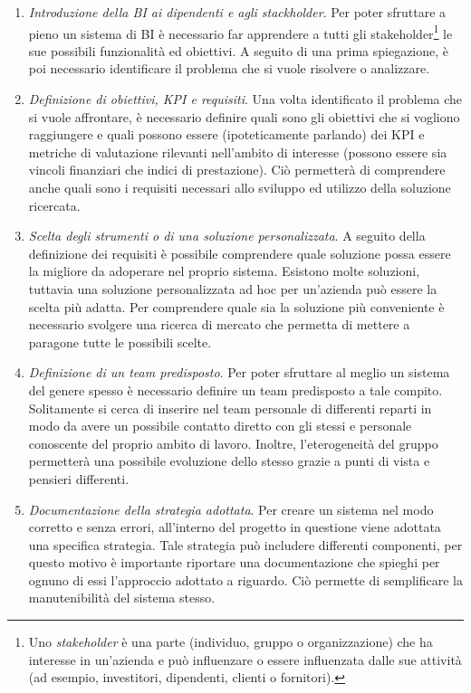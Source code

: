 \begin{enumerate}
    \item \textit{Introduzione della BI ai dipendenti e agli stackholder}. Per poter sfruttare a pieno un sistema di BI è necessario far apprendere a tutti gli stakeholder\footnote{Uno \textit{stakeholder} è una parte (individuo, gruppo o organizzazione) che ha interesse in un'azienda e può influenzare o essere influenzata dalle sue attività (ad esempio, investitori, dipendenti, clienti o fornitori).\cite{investopedia_stakeholder}} le sue possibili funzionalità ed obiettivi. A seguito di una prima spiegazione, è poi necessario identificare il problema che si vuole risolvere o analizzare.
    \item \textit{Definizione di obiettivi, KPI e requisiti}. Una volta identificato il problema che si vuole affrontare, è necessario definire quali sono gli obiettivi che si vogliono raggiungere e quali possono essere (ipoteticamente parlando) dei KPI e metriche di valutazione rilevanti nell'ambito di interesse (possono essere sia vincoli finanziari che indici di prestazione). Ciò permetterà di comprendere anche quali sono i requisiti necessari allo sviluppo ed utilizzo della soluzione ricercata.
    \item \textit{Scelta degli strumenti o di una soluzione personalizzata}. A seguito della definizione dei requisiti è possibile comprendere quale soluzione possa essere la migliore da adoperare nel proprio sistema. Esistono molte soluzioni, tuttavia una soluzione personalizzata ad hoc per un'azienda può essere la scelta più adatta. Per comprendere quale sia la soluzione più conveniente è necessario svolgere una ricerca di mercato che permetta di mettere a paragone tutte le possibili scelte.
    \item \textit{Definizione di un team predisposto}. Per poter sfruttare al meglio un sistema del genere spesso è necessario definire un team predisposto a tale compito. Solitamente si cerca di inserire nel team personale di differenti reparti in modo da avere un possibile contatto diretto con gli stessi e personale conoscente del proprio ambito di lavoro. Inoltre, l'eterogeneità del gruppo permetterà una possibile evoluzione dello stesso grazie a punti di vista e pensieri differenti.
    \item \textit{Documentazione della strategia adottata}. Per creare un sistema nel modo corretto e senza errori, all'interno del progetto in questione viene adottata una specifica strategia. Tale strategia può includere differenti componenti, per questo motivo è importante riportare una documentazione che spieghi per ognuno di essi l'approccio adottato a riguardo. Ciò permette di semplificare la manutenibilità del sistema stesso.

\end{enumerate}
